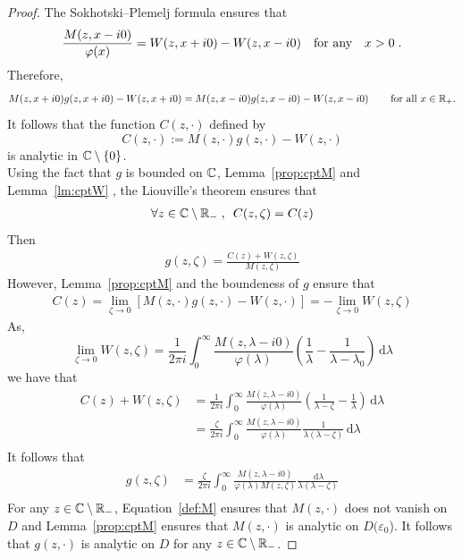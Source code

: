 \documentclass[11pt]{amsart}
\newcommand{\diff}{\,\mathrm{d}}
\begin{document}
\begin{proof}
The Sokhotski–Plemelj formula ensures that 
\begin{align*}
    \frac{M(z,x-i0)}{\varphi(x)}
    = 
    W(z,x+i0) - W(z,x-i0)
    \quad \text{for any} \quad
    x > 0
    \; .
\end{align*}
Therefore, 
\begin{align*}
    M(z,x+i0)g(z, x+i0) -W(z,x+i0) = M(z,x-i0)g(z, x-i0) - W(z,x-i0) \, \qquad \text{for all $x\in\mathbb{R}_+$}.
\end{align*}
It follows that the function $C(z,\cdot)$ defined by 
$$ C(z,\cdot) := M(z,\cdot)g(z,\cdot) - W(z,\cdot)$$
is analytic in $\mathbb{C} \setminus \{0\}$.\\

Using the fact that $g$ is bounded on $\mathbb{C}$, Lemma~\ref{prop:cptM} and Lemma~\ref{lm:cptW}
, the Liouville's theorem ensures that
\begin{align*}
    \forall z \in \mathbb{C} \setminus \mathbb{R}_-
    \; , \enspace
    C(z,\zeta) = C(z)
\end{align*}
Then 
\begin{align}
    g(z,\zeta) = \frac{C(z)+W(z,\zeta)}{M(z,\zeta)}
\end{align}
However, Lemma~\ref{prop:cptM} and the boundeness of $g$ ensure that
\begin{align}
C(z) 
= \lim_{\zeta \to 0}[M(z,\cdot)g(z,\cdot) - W(z,\cdot)] 
= -\lim_{\zeta \to 0}W(z,\zeta)
\end{align}
As, 
$$ \lim_{\zeta \to 0}W(z,\zeta) 
= \frac{1}{2\pi i}\int_0^\infty  \frac{M(z,\lambda-i0)}{\varphi(\lambda)}\left( \frac{1}{\lambda} - \frac{1}{\lambda-\lambda_0}\right) \diff \lambda $$
we have that
\begin{align*}
    C(z) + W(z,\zeta)
    &= 
    \frac{1}{2\pi i}\int_0^\infty  \frac{M(z,\lambda-i0)}{\varphi(\lambda)}\left( \frac{1}{\lambda-\zeta}-\frac{1}{\lambda}\right) \diff \lambda \\
    &= 
    \frac{\zeta}{2\pi i}\int_0^\infty  \frac{M(z,\lambda-i0)}{\varphi(\lambda)} \frac{1}{\lambda(\lambda-\zeta)} \diff \lambda \\
\end{align*}
It follows that 
\begin{align*}
    g(z,\zeta) 
    &= 
    \frac{\zeta}{2\pi i}\int_0^\infty  \frac{M(z,\lambda-i0)}{\varphi(\lambda)M(z,\zeta)} \frac{\diff \lambda}{\lambda(\lambda-\zeta)} \\
\end{align*}
For any $z \in \mathbb{C} \setminus \mathbb{R}_-$, Equation~\eqref{def:M} ensures that $M(z, \cdot)$ does not vanish on $D$ and Lemma~\ref{prop:cptM} ensures that $M(z, \cdot)$ is analytic on $D(\varepsilon_0$). It follows that $g(z, \cdot)$ is analytic on $D$ for any $z \in \mathbb{C} \setminus \mathbb{R}_-$.

\end{proof}
\end{document}
